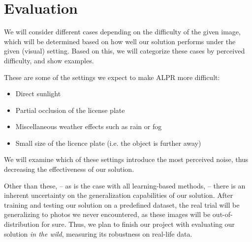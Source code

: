 \section{Evaluation}



We will consider different cases depending on the difficulty of the given image,
which will be determined based on how well our solution performs under
the given (visual) setting. Based on this, we will categorize these cases by
perceived difficulty, and show examples.

These are some of the settings we expect to make \ac{ALPR} more
difficult:
\begin{itemize}
    \item Direct sunlight 
    \item Partial occlusion of the license plate 
    \item Miscellaneous weather effects such as rain or fog
    \item Small size of the licence plate (i.e. the object is further away)
\end{itemize}

We will examine which of these settings introduce the most perceived noise, thus
decreasing the effectiveness of our solution.

Other than these, -- as is the case with all learning-based methods, -- there is
an inherent uncertainty on the generalization capabilities of our solution.
After training and testing our solution on a predefined dataset, the real trial
will be generalizing to photos we never encountered, as these images will be
out-of-distribution for sure. Thus, we plan to finish our project with
evaluating our solution \textit{in the wild}, measuring its robustness on
real-life data.


